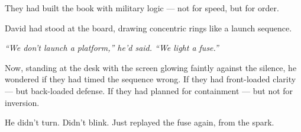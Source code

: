 \medskip

They had built the book with military logic — not for speed, but for order.


David had stood at the board, drawing concentric rings like a launch sequence.

\textit{“We don’t launch a platform,” he’d said. “We light a fuse.”}

Now, standing at the desk with the screen glowing faintly against the silence,
he wondered if they had timed the sequence wrong.
If they had front-loaded clarity — but back-loaded defense.
If they had planned for containment — but not for inversion.

He didn’t turn.
Didn’t blink.
Just replayed the fuse again, from the spark.



